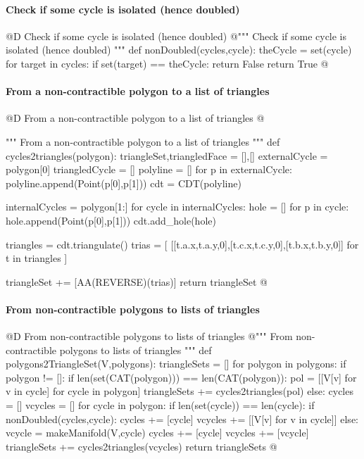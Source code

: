 \documentclass[11pt,oneside]{article}    %
\begin{document}
\paragraph{Check if some cycle is isolated (hence doubled)}
@D Check if some cycle is isolated (hence doubled) 
@{""" Check if some cycle is isolated (hence doubled) """
def nonDoubled(cycles,cycle):
    theCycle = set(cycle)
    for target in cycles:
        if set(target) == theCycle: return False
    return True
@}

\paragraph{From a non-contractible polygon to a list of triangles}
@D From a non-contractible polygon to a list of triangles 
@{""" From a non-contractible polygon to a list of triangles """
def cycles2triangles(polygon): 
    triangleSet,triangledFace = [],[]
    externalCycle = polygon[0]
    triangledCycle = []
    polyline = []
    for p in externalCycle:
        polyline.append(Point(p[0],p[1]))
    cdt = CDT(polyline)

    internalCycles = polygon[1:]
    for cycle in internalCycles:
        hole = []
        for p in cycle:
            hole.append(Point(p[0],p[1]))
        cdt.add_hole(hole)

    triangles = cdt.triangulate()
    trias = [ [[t.a.x,t.a.y,0],[t.c.x,t.c.y,0],[t.b.x,t.b.y,0]] 
        for t in triangles ]
    
    triangleSet += [AA(REVERSE)(trias)]
    return triangleSet
@}

\paragraph{From non-contractible polygons to lists of triangles}
@D From non-contractible polygons to lists of triangles 
@{""" From non-contractible polygons to lists of triangles """
def polygons2TriangleSet(V,polygons):
    triangleSets = []
    for polygon in polygons:
        if polygon != []:
            if len(set(CAT(polygon))) == len(CAT(polygon)):
                pol = [[V[v] for v in cycle] for cycle in polygon]
                triangleSets += cycles2triangles(pol)
            else:
                cycles = []
                vcycles = []
                for cycle in polygon:
                    if len(set(cycle)) == len(cycle):
                        if nonDoubled(cycles,cycle):
                            cycles += [cycle]
                            vcycles += [[V[v] for v in cycle]]
                    else:
                        vcycle = makeManifold(V,cycle)
                        cycles += [cycle]
                        vcycles += [vcycle]
                triangleSets += cycles2triangles(vcycles)
    return triangleSets
@}
\end{document}
